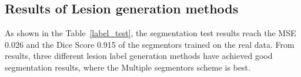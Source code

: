 \documentclass[letterpaper]{article} %
\begin{document}
\subsection{Results of Lesion generation methods}
\begin{table}[t]
	\caption{Lesion generation methods experiments}\smallskip
	\centering
	\label{label_test}	
\end{table}

As shown in the Table~\ref{label_test}, the segmentation test results reach the MSE 0.026 and the Dice Score 0.915 of the segmentors trained on the real data. From results, three different lesion label generation methods have achieved good segmentation results, where the Multiple segmentors scheme is best. 
\end{document}
